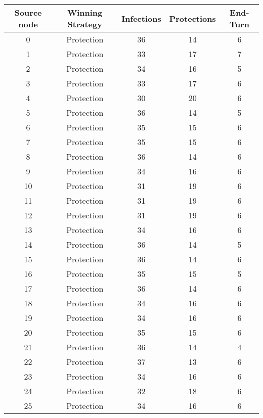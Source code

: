 \documentclass[results.tex]{subfiles}
\begin{document}
\begin{center}
  \begin{tabular}{| c || c | c | c | c |}
    \hline
    {\bfseries Source node} & {\bfseries Winning Strategy} & {\bfseries Infections} & {\bfseries Protections} & {\bfseries End-Turn} \\  %
    \hline\hline
    0 & Protection & 36 & 14 & 6 \\ 
    \hline
    1 & Protection & 33 & 17 & 7 \\ 
    \hline
    2 & Protection & 34 & 16 & 5 \\ 
    \hline
    3 & Protection & 33 & 17 & 6 \\ 
    \hline
    4 & Protection & 30 & 20 & 6 \\ 
    \hline
    5 & Protection & 36 & 14 & 5 \\ 
    \hline
    6 & Protection & 35 & 15 & 6 \\ 
    \hline
    7 & Protection & 35 & 15 & 6 \\ 
    \hline
    8 & Protection & 36 & 14 & 6 \\ 
    \hline
    9 & Protection & 34 & 16 & 6 \\ 
    \hline
    10 & Protection & 31 & 19 & 6 \\ 
    \hline
    11 & Protection & 31 & 19 & 6 \\ 
    \hline
    12 & Protection & 31 & 19 & 6 \\ 
    \hline
    13 & Protection & 34 & 16 & 6 \\ 
    \hline
    14 & Protection & 36 & 14 & 5 \\ 
    \hline
    15 & Protection & 36 & 14 & 6 \\ 
    \hline
    16 & Protection & 35 & 15 & 5 \\ 
    \hline
    17 & Protection & 36 & 14 & 6 \\ 
    \hline
    18 & Protection & 34 & 16 & 6 \\ 
    \hline
    19 & Protection & 34 & 16 & 6 \\ 
    \hline
    20 & Protection & 35 & 15 & 6 \\ 
    \hline
    21 & Protection & 36 & 14 & 4 \\ 
    \hline
    22 & Protection & 37 & 13 & 6 \\ 
    \hline
    23 & Protection & 34 & 16 & 6 \\ 
    \hline
    24 & Protection & 32 & 18 & 6 \\ 
    \hline
    25 & Protection & 34 & 16 & 6 \\ 

\end{tabular}
\end{center}
\end{document}
